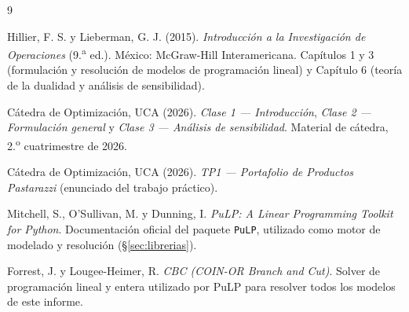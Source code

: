 \documentclass[10pt,a4paper]{article}
\begin{document}
\begin{thebibliography}{9}

 Hillier, F. S. y Lieberman, G. J. (2015).
  \emph{Introducción a la Investigación de Operaciones} (9.\textsuperscript{a}
  ed.). México: McGraw-Hill Interamericana. Capítulos 1 y 3 (formulación y
  resolución de modelos de programación lineal) y Capítulo 6 (teoría de la
  dualidad y análisis de sensibilidad).

 Cátedra de Optimización, UCA
  (2026). \emph{Clase 1 — Introducción}, \emph{Clase 2 — Formulación general}
  y \emph{Clase 3 — Análisis de sensibilidad}. Material de cátedra, 2.\textsuperscript{o}
  cuatrimestre de 2026.

 Cátedra de Optimización, UCA
  (2026). \emph{TP1 — Portafolio de Productos Pastarazzi} (enunciado del
  trabajo práctico).

 Mitchell, S., O'Sullivan, M. y Dunning, I. \emph{PuLP: A Linear
  Programming Toolkit for Python}. Documentación oficial del paquete
  \texttt{PuLP}, utilizado como motor de modelado y resolución
  (\S\ref{sec:librerias}).

 Forrest, J. y Lougee-Heimer, R. \emph{CBC (COIN-OR Branch and Cut)}.
  Solver de programación lineal y entera utilizado por PuLP para resolver
  todos los modelos de este informe.

\end{thebibliography}
\end{document}
